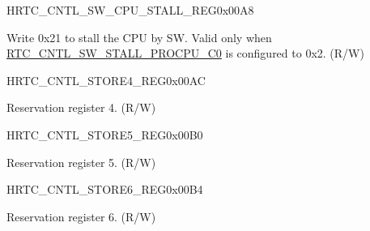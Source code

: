 \begin{register}{H}{RTC\_CNTL\_SW\_CPU\_STALL\_REG}{0x00A8}\label{regdesc:RTCCNTLSWCPUSTALLREG}
%
%
\regnewline%
\begin{regdesc}\begin{reglist}
\label{fielddesc:RTCCNTLSWSTALLPROCPUC1}\item [RTC\_CNTL\_SW\_STALL\_PROCPU\_C1] Write 0x21 to stall the CPU by SW. Valid only when \hyperref[fielddesc:RTCCNTLSWSTALLPROCPUC0]{RTC\_CNTL\_SW\_STALL\_PROCPU\_C0} is configured to 0x2. (R/W)
\end{reglist}\end{regdesc}
\end{register}


\begin{register}{H}{RTC\_CNTL\_STORE4\_REG}{0x00AC}\label{regdesc:RTCCNTLSTORE4REG}
%
\regnewline%
\begin{regdesc}\begin{reglist}
\label{fielddesc:RTCCNTLSCRATCH4}\item [RTC\_CNTL\_SCRATCH4] Reservation register 4. (R/W)
\end{reglist}\end{regdesc}
\end{register}


\begin{register}{H}{RTC\_CNTL\_STORE5\_REG}{0x00B0}\label{regdesc:RTCCNTLSTORE5REG}
%
\regnewline%
\begin{regdesc}\begin{reglist}
\label{fielddesc:RTCCNTLSCRATCH5}\item [RTC\_CNTL\_SCRATCH5] Reservation register 5. (R/W)
\end{reglist}\end{regdesc}
\end{register}


\begin{register}{H}{RTC\_CNTL\_STORE6\_REG}{0x00B4}\label{regdesc:RTCCNTLSTORE6REG}
%
\regnewline%
\begin{regdesc}\begin{reglist}
\label{fielddesc:RTCCNTLSCRATCH6}\item [RTC\_CNTL\_SCRATCH6] Reservation register 6. (R/W)
\end{reglist}\end{regdesc}
\end{register}


